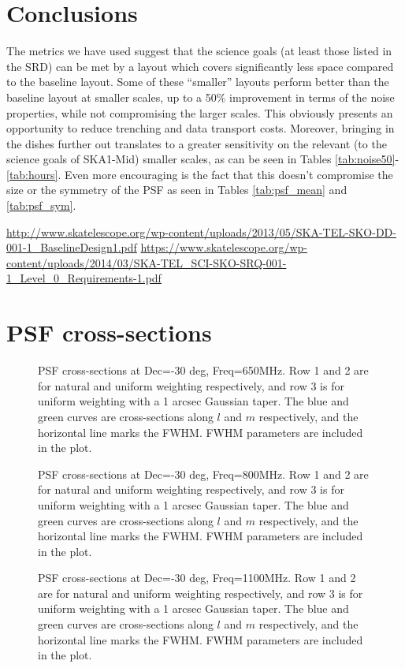 \documentclass[sfheadings,a4paper,10pt,floats,floatfix]{article}
\begin{document}
\section{Conclusions}\label{sec:conclusion}
The metrics we have used suggest that the science goals (at least those listed in the SRD) can be met by a layout which
covers significantly less space compared to the baseline layout. Some of these ``smaller'' layouts perform better than the
baseline layout at smaller scales, up to a 50\% improvement in terms of the noise properties, while not compromising the larger
scales. This obviously presents an opportunity to reduce trenching and data transport costs. Moreover, bringing in the dishes
further out translates to a greater sensitivity on the relevant (to the science goals of SKA1-Mid) smaller scales, as can be seen
in Tables \ref{tab:noise50}-\ref{tab:hours}. Even more encouraging is the fact that this doesn't compromise the size or the
symmetry of the PSF as seen in Tables \ref{tab:psf_mean} and \ref{tab:psf_sym}.
\begin{thebibliography}{99}
  \url{http://www.skatelescope.org/wp-content/uploads/2013/05/SKA-TEL-SKO-DD-001-1_BaselineDesign1.pdf}
  \url{https://www.skatelescope.org/wp-content/uploads/2014/03/SKA-TEL_SCI-SKO-SRQ-001-1_Level_0_Requirements-1.pdf}
\end{thebibliography}
\appendix
\section{PSF cross-sections}\label{app:psf}
\begin{figure}[H]
 \tiny{}
 \caption{PSF cross-sections at Dec=-30 deg, Freq=650MHz. Row 1 and 2 are for natural and uniform weighting respectively, and row
3 is for uniform weighting with a 1 arcsec Gaussian taper. The blue and green curves are cross-sections along $l$ and $m$
respectively, and the horizontal line marks the FWHM. FWHM parameters are included in the plot.}
\end{figure}
\begin{figure}[H]
 \tiny{}
 \caption{PSF cross-sections at Dec=-30 deg, Freq=800MHz. Row 1 and 2 are for natural and uniform weighting respectively, and  row
3 is for uniform weighting with a 1 arcsec Gaussian taper. The blue and green curves are cross-sections along $l$ and $m$
respectively, and the horizontal line marks the FWHM. FWHM parameters are included in the plot.}
\end{figure}
\begin{figure}[H]
 \tiny{}
 \caption{PSF cross-sections at Dec=-30 deg, Freq=1100MHz. Row 1 and 2 are for natural and uniform weighting respectively, and row
3 is for uniform weighting with a 1 arcsec Gaussian taper. The blue and green curves are cross-sections along $l$ and $m$
respectively, and the horizontal line marks the FWHM. FWHM parameters are included in the plot.}
\end{figure}
\end{document}
